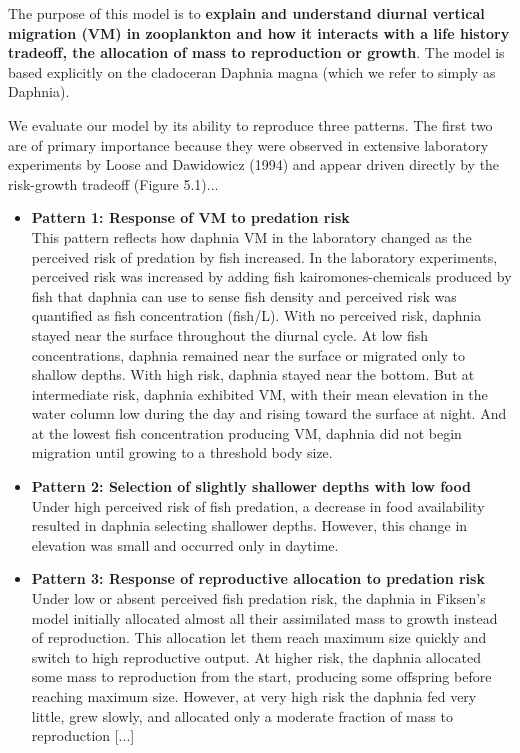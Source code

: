 \documentclass[
  man,
  10pt,
  a4paper,
  floatsintext
]{apa7}
\begin{document}

{
  \color{gddarkredb}
  The purpose of this model is to \textbf{explain and understand diurnal vertical migration (VM) in zooplankton and how it interacts with a life history tradeoff, the allocation of mass to reproduction or growth}. The model is based explicitly on the cladoceran Daphnia magna (which we refer to simply as Daphnia).
}

{
  \color{gddarkgreenb}
  We evaluate our model by its ability to reproduce three patterns. The first two are of primary importance because they were observed in extensive laboratory experiments by Loose and Dawidowicz (1994) and appear driven directly by the risk-growth tradeoff (Figure 5.1)...

  \begin{itemize}
    \item \textbf{Pattern 1: Response of VM to predation risk} \\
    This pattern reflects how daphnia VM in the laboratory changed as the perceived risk of predation by fish increased. In the laboratory experiments, perceived risk was increased by adding fish kairomones-chemicals produced by fish that daphnia can use to sense fish density and perceived risk was quantified as fish concentration (fish/L). With no perceived risk, daphnia stayed near the surface throughout the diurnal cycle. At low fish concentrations, daphnia remained near the surface or migrated only to shallow depths. With high risk, daphnia stayed near the bottom. But at intermediate risk, daphnia exhibited VM, with their mean elevation in the water column low during the day and rising toward the surface at night. And at the lowest fish concentration producing VM, daphnia did not begin migration until growing to a threshold body size.
    \item \textbf{Pattern 2: Selection of slightly shallower depths with low food} \\
    Under high perceived risk of fish predation, a decrease in food availability resulted in daphnia selecting shallower depths. However, this change in elevation was small and occurred only in daytime.
    \item \textbf{Pattern 3: Response of reproductive allocation to predation risk} \\
    Under low or absent perceived fish predation risk, the daphnia in Fiksen's model initially allocated almost all their assimilated mass to growth instead of reproduction. This allocation let them reach maximum size quickly and switch to high reproductive output. At higher risk, the daphnia allocated some mass to reproduction from the start, producing some offspring before reaching maximum size. However, at very high risk the daphnia fed very little, grew slowly, and allocated only a moderate fraction of mass to reproduction [...]
  \end{itemize}
}
\end{document}
